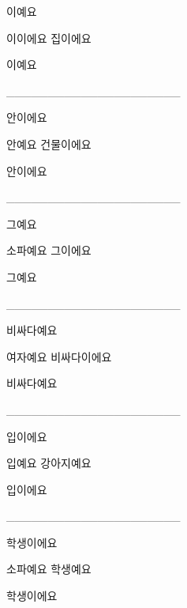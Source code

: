 \documentclass[addpoints, 30pt]{../exam}%
\begin{document}
\begin{questions}
\begin{choices}
\begin{solution}%
이예요%
\end{solution}%
\choice%
이이에요%
\CorrectChoice%
집이에요%
\end{choices}%
\begin{solution}%
이예요%
\end{solution}%
\question[1]%
\_\_\_\_\_\_\_\_\_\_\_\_\_\_\_\_\_\_\_\_\_%
\begin{choices}%
\begin{solution}%
안이에요%
\end{solution}%
\choice%
안예요%
\CorrectChoice%
건물이에요%
\end{choices}%
\begin{solution}%
안이에요%
\end{solution}%
\question[1]%
\_\_\_\_\_\_\_\_\_\_\_\_\_\_\_\_\_\_\_\_\_%
\begin{choices}%
\begin{solution}%
그예요%
\end{solution}%
\CorrectChoice%
소파예요%
\choice%
그이에요%
\end{choices}%
\begin{solution}%
그예요%
\end{solution}%
\question[1]%
\_\_\_\_\_\_\_\_\_\_\_\_\_\_\_\_\_\_\_\_\_%
\begin{choices}%
\begin{solution}%
비싸다예요%
\end{solution}%
\CorrectChoice%
여자예요%
\choice%
비싸다이에요%
\end{choices}%
\begin{solution}%
비싸다예요%
\end{solution}%
\question[1]%
\_\_\_\_\_\_\_\_\_\_\_\_\_\_\_\_\_\_\_\_\_%
\begin{choices}%
\begin{solution}%
입이에요%
\end{solution}%
\choice%
입예요%
\CorrectChoice%
강아지예요%
\end{choices}%
\begin{solution}%
입이에요%
\end{solution}%
\question[1]%
\_\_\_\_\_\_\_\_\_\_\_\_\_\_\_\_\_\_\_\_\_%
\begin{choices}%
\begin{solution}%
학생이에요%
\end{solution}%
\CorrectChoice%
소파예요%
\choice%
학생예요%
\end{choices}%
\begin{solution}%
학생이에요%

\end{solution}
\end{questions}
\end{document}

